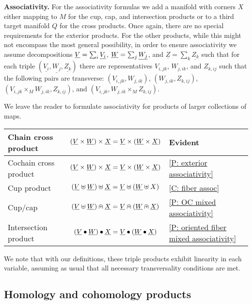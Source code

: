 \medskip\noindent\textbf{Associativity.}
For the associativity formulas we add a manifold with corners $X$ either mapping to $M$ for the cup, cap, and intersection products or to a third target manifold $Q$ for the cross products.
Once again, there are no special requirements for the exterior products.
For the other products, while this might not encompass the most general possibility, in order to ensure associativity we assume decompositions $\underline{V} = \sum_i \underline{V_i}$, $\underline{W} = \sum_j \underline{W_j}$, and $\underline{Z} = \sum_k \underline{Z_k}$ such that for each triple $(\underline{V_i},\underline{W_j}, \underline{Z_k})$ there are representatives $V_{i,jk}$, $W_{j,ik}$, and $Z_{k,ij}$ such that the following pairs are transverse: $(V_{i,jk}, W_{j,ik})$, $(W_{j,ik},Z_{k,ij})$, $(V_{i,jk} \times_M W_{j,ik},Z_{k,ij})$, and $(V_{i,jk}, W_{j,ik} \times_M Z_{k,ij})$.

We leave the reader to formulate associativity for products of larger collections of maps.

\smallskip
\begin{center}
	\begin{tabular}{|l|c|l|}
		\hline
		Chain cross product& $(\underline{V} \times \underline{W}) \times \underline{X} = \underline{V} \times (\underline{W} \times \underline{X})$&Evident\\
		\hline
		Cochain cross product& $(\underline{V} \times \underline{W}) \times \underline{X} = \underline{V} \times (\underline{W} \times \underline{X})$&\cref{P: exterior associativity}\\
		\hline
		Cup product &$(\underline{V}\uplus \underline{W})\uplus\underline{X} = \underline{V}\uplus(\underline{W}\uplus X)$&\cref{C: fiber assoc} \\
		\hline
		Cup/cap & $(\underline{V} \uplus \underline{W})\nplus \underline{X} = \underline{V}\nplus(\underline{W}\nplus\underline{X})$& \cref{P: OC mixed associativity}\\
		\hline
		Intersection product &
		$(\underline{V}\bullet\underline{W})\bullet\underline{X} = \underline{V}\bullet(\underline{W}\bullet \underline{X})$&\cref{P: oriented fiber mixed associativity}\\
		\hline
	\end{tabular}
\end{center}

\medskip

We note that with our definitions, these triple products exhibit linearity in each variable, assuming as usual that all necessary transversality conditions are met.

\subsection{Homology and cohomology products}\label{S: homology products}

